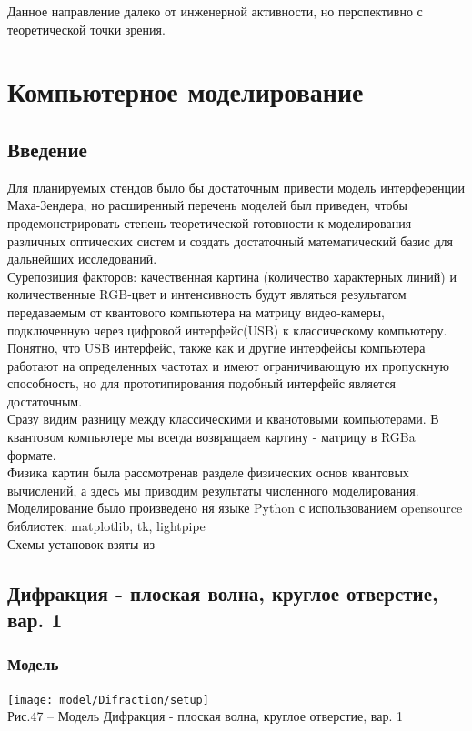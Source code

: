 \documentclass[11pt]{report}
\begin{document}
Данное направление далеко от инженерной активности, но перспективно с теоретической точки зрения.


\chapter{Компьютерное моделирование }
\section{Введение}
Для планируемых стендов было бы достаточным привести модель интерференции Маха-Зендера, но расширенный перечень моделей был приведен, чтобы продемонстрировать степень теоретической готовности к моделирования различных оптических систем и создать достаточный математический базис для дальнейших исследований. \\

Сурепозиция факторов: качественная картина (количество характерных линий) и количественные RGB-цвет и интенсивность будут являться результатом передаваемым от квантового компьютера на матрицу видео-камеры, подключенную через цифровой интерфейс(USB) к классическому компьютеру. Понятно, что USB интерфейс, также как и другие интерфейсы компьютера работают на определенных частотах и имеют ограничивающую их пропускную способность, но для прототипирования подобный интерфейс является достаточным.\\

Сразу видим разницу между классическими и кванотовыми компьютерами. В квантовом компьютере мы всегда возвращаем картину - матрицу в RGBa формате. \\

Физика картин была рассмотренав разделе физических основ квантовых вычислений, а здесь мы приводим результаты численного моделирования.\\

Моделирование было произведено ня языке Python с использованием opensource библиотек: matplotlib, tk, lightpipe \\

Схемы установок взяты из ~\cite{optic}

\section{Дифракция - плоская волна, круглое отверстие, вар. 1}
\subsection{Модель}
\texttt{[image: model/Difraction/setup]}\\
Рис.47 -- Модель Дифракция - плоская волна, круглое отверстие, вар. 1\\
\end{document}
